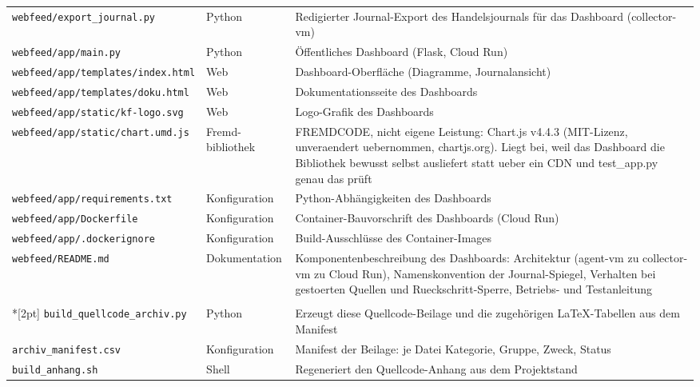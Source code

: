 \begin{longtable}{@{}p{}p{}p{}@{}}
  \texttt{webfeed/\allowbreak export\_\allowbreak journal.py} & Python & Redigierter Journal-Export des Handelsjournals für das Dashboard (collector-vm) \\
  \texttt{webfeed/\allowbreak app/\allowbreak main.py} & Python & Öffentliches Dashboard (Flask, Cloud Run) \\
  \texttt{webfeed/\allowbreak app/\allowbreak templates/\allowbreak index.html} & Web & Dashboard-Oberfläche (Diagramme, Journalansicht) \\
  \texttt{webfeed/\allowbreak app/\allowbreak templates/\allowbreak doku.html} & Web & Dokumentationsseite des Dashboards \\
  \texttt{webfeed/\allowbreak app/\allowbreak static/\allowbreak kf-logo.svg} & Web & Logo-Grafik des Dashboards \\
  \texttt{webfeed/\allowbreak app/\allowbreak static/\allowbreak chart.umd.js} & Fremd-bibliothek & FREMDCODE, nicht eigene Leistung: Chart.js v4.4.3 (MIT-Lizenz, unveraendert uebernommen, chartjs.org). Liegt bei, weil das Dashboard die Bibliothek bewusst selbst ausliefert statt ueber ein CDN und test\_app.py genau das prüft \\
  \texttt{webfeed/\allowbreak app/\allowbreak requirements.txt} & Kon\-fi\-gu\-ra\-tion & Python-Abhängigkeiten des Dashboards \\
  \texttt{webfeed/\allowbreak app/\allowbreak Dockerfile} & Kon\-fi\-gu\-ra\-tion & Container-Bauvorschrift des Dashboards (Cloud Run) \\
  \texttt{webfeed/\allowbreak app/\allowbreak .dockerignore} & Kon\-fi\-gu\-ra\-tion & Build-Ausschlüsse des Container-Images \\
  \texttt{webfeed/\allowbreak README.md} & Dokumentation & Komponentenbeschreibung des Dashboards: Architektur (agent-vm zu collector-vm zu Cloud Run), Namenskonvention der Journal-Spiegel, Verhalten bei gestoerten Quellen und Rueckschritt-Sperre, Betriebs- und Testanleitung \\
  \addlinespace[6pt]
  \multicolumn{3}{@{}l}{\textbf{Reproduzierbarkeit der Beilage}}\\*[2pt]
  \texttt{build\_\allowbreak quellcode\_\allowbreak archiv.py} & Python & Erzeugt diese Quellcode-Beilage und die zugehörigen LaTeX-Tabellen aus dem Manifest \\
  \texttt{archiv\_\allowbreak manifest.csv} & Kon\-fi\-gu\-ra\-tion & Manifest der Beilage: je Datei Kategorie, Gruppe, Zweck, Status \\
  \texttt{build\_\allowbreak anhang.sh} & Shell & Regeneriert den Quellcode-Anhang aus dem Projektstand \\

\end{longtable}
